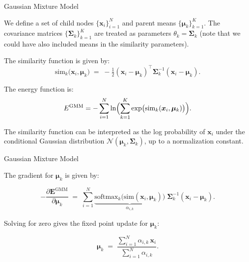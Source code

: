 \documentclass{beamer}
\begin{document}
\begin{frame}{Gaussian Mixture Model}

    We define a set of child nodes \(\{\bm{x}_i\}_{i=1}^N\) and parent means \(\{\bm{\mu}_k\}_{k=1}^K\). The covariance matrices \(\{\bm{\Sigma}_k\}_{k=1}^K\) are treated as parameters \(\theta_k = \bm{\Sigma}_k\) (note that we could have also included means in the similarity parameters).
    
    \bigskip
    
    The similarity function is given by:
    \[
    \mathrm{sim}_k\bigl(\bm{x}_i,\bm{\mu}_k\bigr)
    \;=\;
    -\tfrac{1}{2}
    (\bm{x}_i - \bm{\mu}_k)^\top \bm{\Sigma}_k^{-1}(\bm{x}_i - \bm{\mu}_k).
    \]
    
    The energy function is:
    \[
    E^{\mathrm{GMM}}
    =
    -\sum_{i=1}^N
    \ln \Bigl(\sum_{k=1}^K
    \exp\bigl(\mathrm{sim}_k(\bm{x}_i,\bm{\mu}_k)\bigr)\Bigr).
    \]

    The similarity function can be interpreted as the log probability of \(\bm{x}_i\) under the conditional Gaussian distribution \(\mathcal{N}(\bm{\mu}_k, \bm{\Sigma}_k)\), up to a normalization constant.

\end{frame}

    

\begin{frame}{Gaussian Mixture Model}

The gradient for $\bm{\mu}_k$ is given by:

\[
-\frac{\partial \bm{E}^{\mathrm{GMM}}}{\partial \bm{\mu}_k}
\;=\;
\sum_{i=1}^N 
\underbrace{\mathrm{softmax}_{k} \bigl(\mathrm{sim}(\bm{x}_i,\bm{\mu}_k)\bigr)}_{\alpha_{i,k}}
\;\bm{\Sigma}_k^{-1}(\bm{x}_i - \bm{\mu}_k).
\]

Solving for zero gives the fixed point update for \(\bm{\mu}_k\):

\[
\bm{\mu}_k
\;=\;
\frac{\sum_{i=1}^N \alpha_{i,k}\,\bm{x}_i}
     {\sum_{i=1}^N \alpha_{i,k}}.
\]
\end{frame}


    
\end{document}
